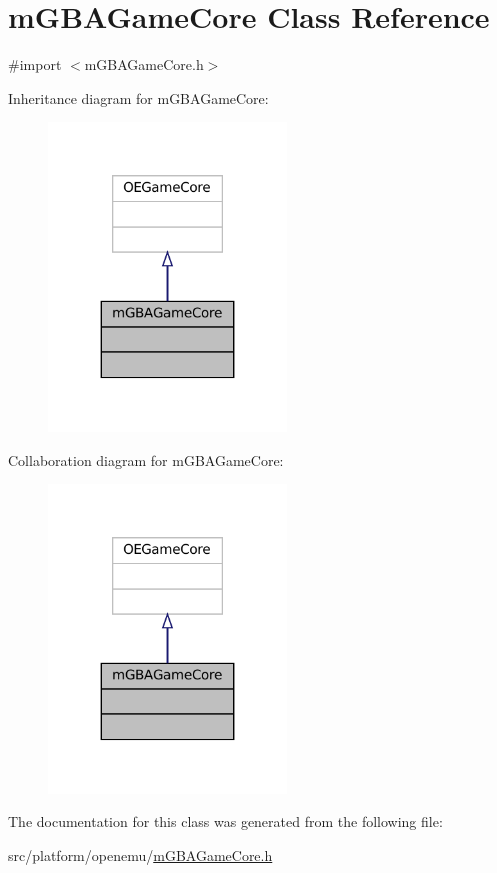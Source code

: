 \hypertarget{interfacem_g_b_a_game_core}{}\section{m\+G\+B\+A\+Game\+Core Class Reference}
\label{interfacem_g_b_a_game_core}


{\ttfamily \#import $<$m\+G\+B\+A\+Game\+Core.\+h$>$}



Inheritance diagram for m\+G\+B\+A\+Game\+Core\+:
\nopagebreak
\begin{figure}[H]
\begin{center}
\leavevmode
\includegraphics[width=179pt]{interfacem_g_b_a_game_core__inherit__graph}
\end{center}
\end{figure}


Collaboration diagram for m\+G\+B\+A\+Game\+Core\+:
\nopagebreak
\begin{figure}[H]
\begin{center}
\leavevmode
\includegraphics[width=179pt]{interfacem_g_b_a_game_core__coll__graph}
\end{center}
\end{figure}


The documentation for this class was generated from the following file\+:\begin{DoxyCompactItemize}
\item 
src/platform/openemu/\mbox{\hyperlink{m_g_b_a_game_core_8h}{m\+G\+B\+A\+Game\+Core.\+h}}\end{DoxyCompactItemize}

